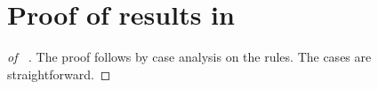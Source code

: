 \section{Proof of results in }

\begin{proof} [of ~]

The proof follows by case analysis on the rules. The cases are straightforward.




			

				
		

					
\end{proof}
